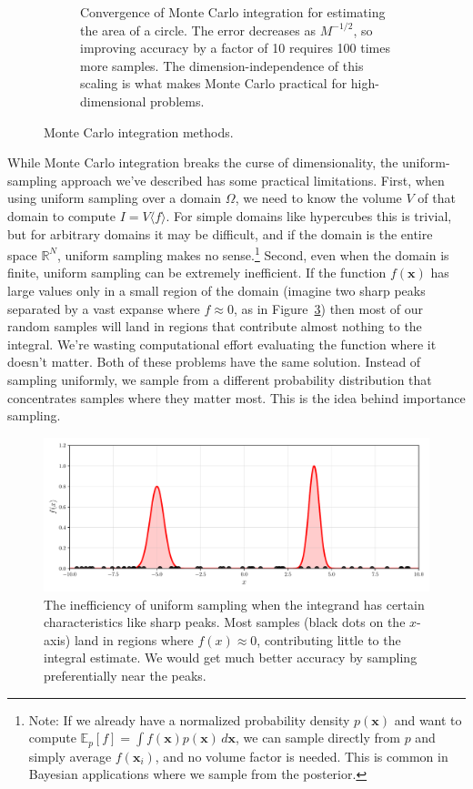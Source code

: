\begin{figure}[htbp]
\begin{subfigure}{0.45\textwidth}
     \caption{Convergence of Monte Carlo integration for estimating the area of a circle. The error decreases as $M^{-1/2}$, so improving accuracy by a factor of 10 requires 100 times more samples. The dimension-independence of this scaling is what makes Monte Carlo practical for high-dimensional problems.}
     \label{fig:mc-convergence}
    \end{subfigure}
    \caption{Monte Carlo integration methods.}
    \label{fig:monte-carlo}
\end{figure}

While Monte Carlo integration breaks the curse of dimensionality, the uniform-sampling approach we've described has some practical limitations. First, when using uniform sampling over a domain $\Omega$, we need to know the volume $V$ of that domain to compute $I = V \langle f \rangle$. For simple domains like hypercubes this is trivial, but for arbitrary domains it may be difficult, and if the domain is the entire space $\mathbb{R}^N$, uniform sampling makes no sense.\footnote{Note: If we already have a normalized probability density $p(\mathbf{x})$ and want to compute $\mathbb{E}_p[f] = \int f(\mathbf{x}) p(\mathbf{x}) \, d\mathbf{x}$, we can sample directly from $p$ and simply average $f(\mathbf{x}_i)$, and no volume factor is needed. This is common in Bayesian applications where we sample from the posterior.} Second, even when the domain is finite, uniform sampling can be extremely inefficient. If the function $f(\mathbf{x})$ has large values only in a small region of the domain (imagine two sharp peaks separated by a vast expanse where $f \approx 0$, as in Figure~\ref{fig:uniform-sampling-problem}) then most of our random samples will land in regions that contribute almost nothing to the integral. We're wasting computational effort evaluating the function where it doesn't matter. Both of these problems have the same solution. Instead of sampling uniformly, we sample from a different probability distribution that concentrates samples where they matter most. This is the idea behind importance sampling.

\begin{figure}[htbp]
    \centering
    \includegraphics[width=.96\textwidth]{./figs/monte-carlo/uniform_sampling_problem.pdf}
    \caption{The inefficiency of uniform sampling when the integrand has certain characteristics like sharp peaks. Most samples (black dots on the $x$-axis) land in regions where $f(x) \approx 0$, contributing little to the integral estimate. We would get much better accuracy by sampling preferentially near the peaks.}
    \label{fig:uniform-sampling-problem}
\end{figure}

